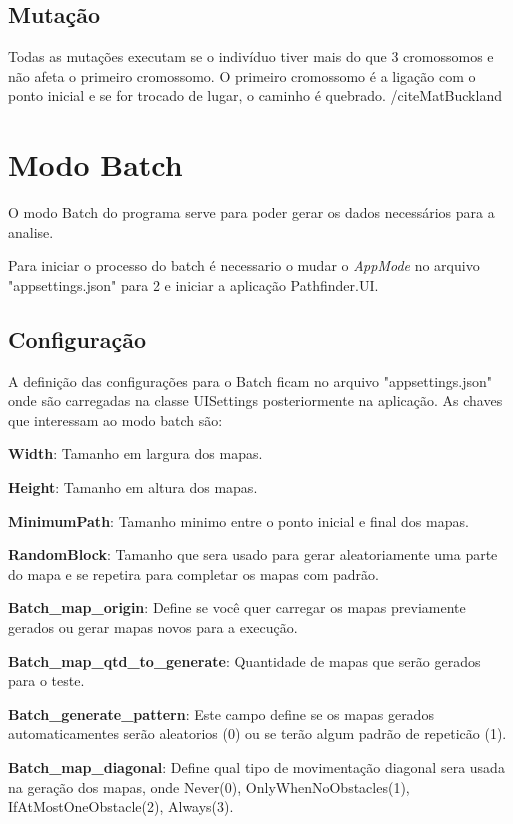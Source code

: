 \subsection{Mutação}

Todas as mutações executam se o indivíduo tiver mais do que 3 cromossomos e não afeta o primeiro cromossomo.
O primeiro cromossomo é a ligação com o ponto inicial e se for trocado de lugar, o caminho é quebrado. /cite{MatBuckland}

\section{Modo Batch}

O modo Batch do programa serve para poder gerar os dados necessários para a analise.

Para iniciar o processo do batch é necessario o mudar o \textit{AppMode} no arquivo "appsettings.json" para 2 e iniciar a aplicação Pathfinder.UI.


\subsection{Configuração}

A definição das configurações para o Batch ficam no arquivo "appsettings.json" onde são carregadas na classe UISettings posteriormente na aplicação. As chaves que interessam ao modo batch são:

\textbf{Width}: Tamanho em largura dos mapas.

\textbf{Height}: Tamanho em altura dos mapas.

\textbf{MinimumPath}: Tamanho minimo entre o ponto inicial e final dos mapas.

\textbf{RandomBlock}: Tamanho que sera usado para gerar aleatoriamente uma parte do mapa e se repetira para completar os mapas com padrão.

\textbf{Batch\_map\_origin}: Define se você quer carregar os mapas previamente gerados ou gerar mapas novos para a execução.

\textbf{Batch\_map\_qtd\_to\_generate}: Quantidade de mapas que serão gerados para o teste.

\textbf{Batch\_generate\_pattern}: Este campo define se os mapas gerados automaticamentes serão aleatorios (0) ou se terão algum padrão de repeticão (1).

\textbf{Batch\_map\_diagonal}: Define qual tipo de movimentação diagonal sera usada na geração dos mapas, onde Never(0), OnlyWhenNoObstacles(1), IfAtMostOneObstacle(2), Always(3).

